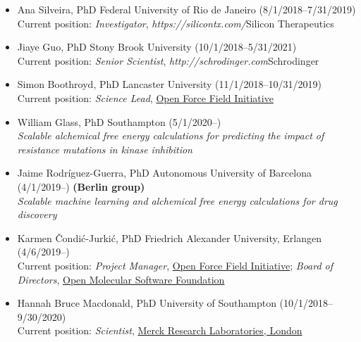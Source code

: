 \documentclass[10pt]{article}
\begin{document}
\begin{itemize}
  \item Ana Silveira, PhD Federal University of Rio de Janeiro (8/1/2018--7/31/2019)\\
  Current position: \emph{Investigator}, \emph{https://silicontx.com/}{Silicon Therapeutics}

  \item Jiaye Guo, PhD Stony Brook University (10/1/2018--5/31/2021)\\
  Current position: \emph{Senior Scientist}, \emph{http://schrodinger.com}{Schrodinger}
  
  \item Simon Boothroyd, PhD Lancaster University (11/1/2018--10/31/2019)\\
  Current position: \emph{Science Lead}, \href{http://openforcefield.org}{Open Force Field Initiative}

  \item William Glass, PhD Southampton (5/1/2020--) \\
  \emph{Scalable alchemical free energy calculations for predicting the impact of resistance mutations in kinase inhibition}

  \item Jaime Rodr\'{i}guez-Guerra, PhD Autonomous University of Barcelona (4/1/2019--) {\bf (Berlin group)}\\
  \emph{Scalable machine learning and alchemical free energy calculations for drug discovery}

  \item Karmen \v{C}ondi\'{c}-Jurki\'{c}, PhD Friedrich Alexander University, Erlangen (4/6/2019--)\\
  Current position: \emph{Project Manager}, \href{http://openforcefield.org}{Open Force Field Initiative}; \emph{Board of Directors}, \href{http://omsf.io}{Open Molecular Software Foundation}

  \item Hannah Bruce Macdonald, PhD University of Southampton (10/1/2018--9/30/2020)\\
  Current position: \emph{Scientist}, \href{http://www.merck.com}{Merck Research Laboratories, London}
  

\end{itemize}
\end{document}
